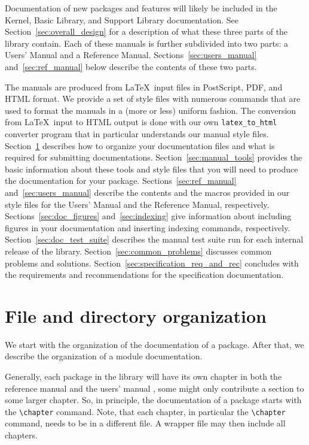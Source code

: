 Documentation of new packages and features will likely be included in
the Kernel, Basic Library, and Support Library documentation.  See
Section~\ref{sec:overall_design} for a description of what these three
parts of the library contain. Each of these manuals is further
subdivided into two parts: a Users' Manual and a Reference Manual.
Sections~\ref{sec:users_manual} and~\ref{sec:ref_manual} below
describe the contents of these two parts.

The manuals are produced from \LaTeX\ input files in PostScript, PDF, and
HTML format. We provide a set of style files with numerous commands
that are used to format the manuals in a (more or less) uniform fashion.
The conversion from \LaTeX\ input to HTML output is done with 
our own \texttt{latex\_to\_html} converter program that in particular
understands our manual style files.  
Section~\ref{sec:files_required} describes how to organize your
documentation files and what is required for submitting documentations. 
Section~\ref{sec:manual_tools} provides the basic information about
these tools and style files that you will need to produce
the documentation for your package.
Sections~\ref{sec:ref_manual} and~\ref{sec:users_manual} describe the
contents and the macros provided in our style files for the Users'
Manual and the Reference Manual, respectively.
Sections~\ref{sec:doc_figures} and~\ref{sec:indexing} give information
about including figures in your documentation and inserting indexing
commands, respectively.
Section~\ref{sec:doc_test_suite} describes the manual test suite run
for each internal release of the library.  
Section~\ref{sec:common_problems} discusses common problems and
solutions.
Section~\ref{sec:specification_req_and_rec} concludes with the
requirements and recommendations for the specification documentation. 

\section{File and directory organization}
\label{sec:files_required}

We start with the organization of the documentation of a
package. After that, we describe the organization of a module documentation.

Generally, each package in the library will have its own chapter in
both the reference manual and the users' manual%
%
, some might only contribute a
section to some larger chapter. So, in principle, the documentation of
a package starts with the \verb|\chapter| command. Note, that each
chapter, in particular the \verb|\chapter| command, needs to be in a
different file. A wrapper file may then include all chapters.

